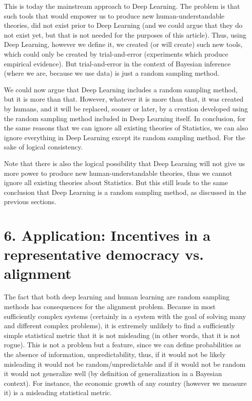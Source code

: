 \documentclass[11pt]{book}
\begin{document}
This is today the mainstream approach to Deep Learning. The problem is
that such tools that would empower us to produce new
human-understandable theories, did not exist prior to Deep Learning (and
we could argue that they do not exist yet, but that is not needed for
the purposes of this article). Thus, using Deep Learning, however we
define it, we created (or will create) such new tools, which could only
be created by trial-and-error (experiments which produce empirical
evidence). But trial-and-error in the context of Bayesian inference
(where we are, because we use data) is just a random sampling method.

We could now argue that Deep Learning includes a random sampling method,
but it is more than that. However, whatever it is more than that, it was
created by humans, and it will be replaced, sooner or later, by a
creation developed using the random sampling method included in Deep
Learning itself. In conclusion, for the same reasons that we can ignore
all existing theories of Statistics, we can also ignore everything in
Deep Learning except its random sampling method. For the sake of logical
consistency.

Note that there is also the logical possibility that Deep Learning will
not give us more power to produce new human-understandable theories,
thus we cannot ignore all existing theories about Statistics. But this
still leads to the same conclusion that Deep Learning is a random
sampling method, as discussed in the previous sections.

\hypertarget{application-incentives-in-a-representative-democracy-vs-alignment}{%
\section{6. Application: Incentives in a representative democracy vs.
alignment}\label{application-incentives-in-a-representative-democracy-vs-alignment}}

The fact that both deep learning and human learning are random sampling
methods has consequences for the alignment
problem\cite{burns_weak--strong_2023}. Because in most sufficiently complex systems (certainly in a
system with the goal of solving many and different complex problems), it
is extremely unlikely to find a sufficiently simple statistical metric
that it is not misleading (in other words, that it is not rogue). This
is not a problem but a feature, since we can define probabilities as the
absence of information, unpredictability, thus, if it would not be
likely misleading it would not be random/unpredictable and if it would
not be random it would not generalize well (by definition of
generalization in a Bayesian context). For instance, the economic growth
of any country (however we measure it) is a misleading statistical
metric.
\end{document}
